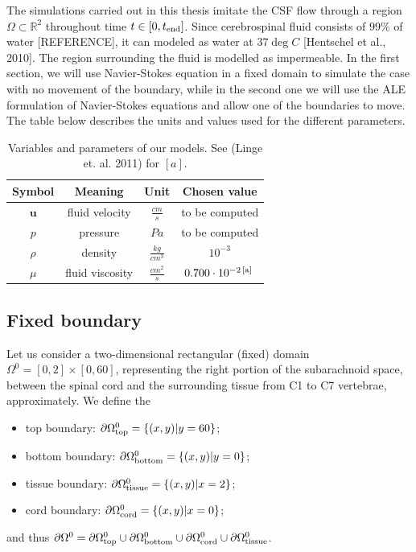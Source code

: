\documentclass[a4paper,11pt,openright,twoside]{book}
\begin{document}
The simulations carried out in this thesis imitate the CSF flow through a region $\Omega \subset \mathbb{R}^2$ throughout time $t \in [0, t_{\rm end}]$. Since cerebrospinal fluid consists of $99 \% $ of water [REFERENCE], it can modeled as water at $37 \deg C$ [Hentschel et al., 2010]. The region surrounding the fluid is modelled as impermeable.
In the first section, we will use Navier-Stokes equation in a fixed domain to simulate the case with no movement of the boundary, while in the second one we will use the ALE formulation of Navier-Stokes equations and allow one of the boundaries to move. The table below describes the units and values used for the different parameters.

\begin{table}[h!]
\begin{center}
\begin{tabular}{| c | c | c | c |}
\hline
\textbf{Symbol} & \textbf{Meaning} & \textbf{Unit} & \textbf{Chosen value} \\
\hline
$\mathbf{u}$ & fluid velocity & $\frac{cm}{s}$ & to be computed \\
\hline
$p$ & pressure & $Pa$ & to be computed \\
\hline
$\rho$ & density & $\frac{kg}{cm^3}$ & $10^{-3}$ \\
\hline
$\mu$ & fluid viscosity & $\frac{cm^2}{s}$ & $0.700 \cdot 10^{-2 \, [\rm a] \, }$ \\
\hline
\end{tabular}
\end{center}
\caption{Variables and parameters of our models. See (Linge et. al. 2011) for $[a]$.}
\end{table}




\subsection{Fixed boundary}
Let us consider a two-dimensional rectangular (fixed) domain $\Omega^0 = [0, 2]
\times [0, 60]$, representing the right portion of the subarachnoid space, between the spinal cord and the surrounding tissue from C1 to C7 vertebrae, approximately. We define the
\begin{itemize}
\item
  top boundary: $\partial \Omega_{\rm top}^0 = \{ (x, y) | y = 60\}$;
\item
  bottom boundary: $\partial \Omega_{\rm bottom}^0 = \{ (x, y) | y = 0\}$;
\item
  tissue boundary: $\partial \Omega_{\rm tissue}^0 = \{ (x, y) | x = 2\}$;
\item
  cord boundary: $\partial \Omega_{\rm cord}^0 = \{ (x, y) | x = 0\}$;
\end{itemize}
and thus $\partial \Omega^0 = \partial \Omega_{\rm top}^0 \cup
\partial \Omega_{\rm bottom}^0 \cup \partial \Omega_{\rm cord}^0 \cup
\partial \Omega_{\rm tissue}^0$.
\end{document}
